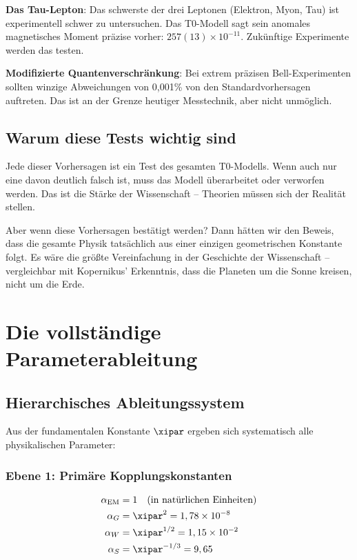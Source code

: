 	\textbf{Das Tau-Lepton}: Das schwerste der drei Leptonen (Elektron, Myon, Tau) ist experimentell schwer zu untersuchen. Das T0-Modell sagt sein anomales magnetisches Moment präzise vorher: $257(13) \times 10^{-11}$. Zukünftige Experimente werden das testen.
	
	\textbf{Modifizierte Quantenverschränkung}: Bei extrem präzisen Bell-Experimenten sollten winzige Abweichungen von 0,001\% von den Standardvorhersagen auftreten. Das ist an der Grenze heutiger Messtechnik, aber nicht unmöglich.
	
	\subsection{Warum diese Tests wichtig sind}
	
	Jede dieser Vorhersagen ist ein Test des gesamten T0-Modells. Wenn auch nur eine davon deutlich falsch ist, muss das Modell überarbeitet oder verworfen werden. Das ist die Stärke der Wissenschaft -- Theorien müssen sich der Realität stellen.
	
	Aber wenn diese Vorhersagen bestätigt werden? Dann hätten wir den Beweis, dass die gesamte Physik tatsächlich aus einer einzigen geometrischen Konstante folgt. Es wäre die größte Vereinfachung in der Geschichte der Wissenschaft -- vergleichbar mit Kopernikus' Erkenntnis, dass die Planeten um die Sonne kreisen, nicht um die Erde.
	
	\section{Die vollständige Parameterableitung}
	
	\subsection{Hierarchisches Ableitungssystem}
	
	Aus der fundamentalen Konstante $\xipar$ ergeben sich systematisch alle physikalischen Parameter:
	
	\subsubsection{Ebene 1: Primäre Kopplungskonstanten}
	\begin{align}
		\alpha_{\text{EM}} &= 1 \quad \text{(in natürlichen Einheiten)} \\
		\alpha_G &= \xipar^2 = 1,78 \times 10^{-8} \\
		\alpha_W &= \xipar^{1/2} = 1,15 \times 10^{-2} \\
		\alpha_S &= \xipar^{-1/3} = 9,65
	\end{align}
	
